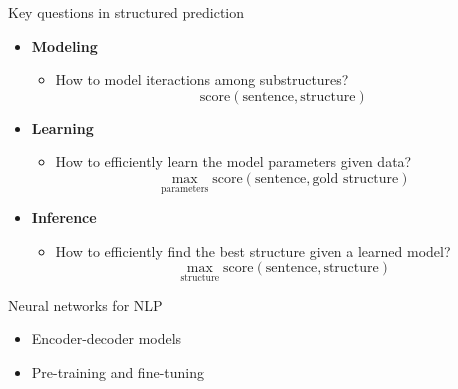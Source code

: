 \documentclass[usenames,dvipsnames,notes,11pt,aspectratio=169]{beamer}
\begin{document}
\begin{frame}
    {Key questions in structured prediction}
    \begin{itemize}
        \item \textbf{Modeling}
            \begin{itemize}
                \item[] How to model iteractions among substructures?
                    $$
                    \text{score}(\text{sentence}, \text{structure})
                    $$
            \end{itemize}
        \item \textbf{Learning} 
            \begin{itemize}
                \item[] How to efficiently learn the model parameters given data?
                    $$
                    \max_{\text{parameters}} \text{score}(\text{sentence}, \text{gold structure})
                    $$
            \end{itemize}
        \item \textbf{Inference} 
            \begin{itemize}
                \item[] How to efficiently find the best structure given a learned model? 
                    $$
                    \max_{\text{structure}} \text{score}(\text{sentence}, \text{structure})
                    $$
            \end{itemize}
    \end{itemize}
\end{frame}

\begin{frame}
    {Neural networks for NLP}
    \begin{itemize}
        \itemsep6em
        \item Encoder-decoder models
        \item Pre-training and fine-tuning
    \end{itemize}
\end{frame}

%
\end{document}
